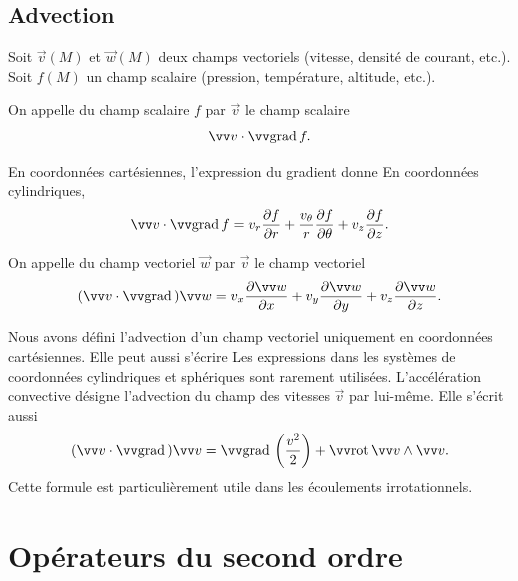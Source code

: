 \subsection{Advection}

Soit $\Vec{v}(M)$ et $\Vec{w}(M)$ deux champs vectoriels (vitesse, densité de courant, etc.). Soit $f(M)$ un champ scalaire (pression, température, altitude, etc.).

\begin{definition}
On appelle  du champ scalaire $f$ par $\Vec{v}$ le champ scalaire $$\Vec{v} \cdot \grad f.$$

\end{definition}

En coordonnées cartésiennes, l'expression du gradient donne
En coordonnées cylindriques,
$$
\Vec{v} \cdot \grad f  =  v_r \dr{f}{r} + \frac{v_\theta}{r} \dr{f}{\theta} + v_z \dr{f}{z}.
$$

\begin{definition}
On appelle  du champ vectoriel $\Vec{w}$ par $\Vec{v}$ le champ vectoriel
$$
(\Vec{v} \cdot \grad) \Vec{w} = v_x \dr{\Vec{w}}{x} + v_y \dr{\Vec{w}}{y} + v_z \dr{\Vec{w}}{z}.
$$

\end{definition}

 Nous avons défini l'advection d'un champ vectoriel uniquement en coordonnées cartésiennes. Elle peut aussi s'écrire
Les expressions dans les systèmes de coordonnées cylindriques et sphériques sont rarement utilisées.
 L’accélération convective désigne l’advection du champ des vitesses $\Vec{v}$ par lui-même. Elle s’écrit aussi
$$
(\Vec{v} \cdot \grad) \Vec{v} = \grad\left( \frac{v^2}{2} \right) + \rot \Vec{v} \pv \Vec{v}.
$$
Cette formule est particulièrement utile dans les écoulements irrotationnels.

\section{Opérateurs du second ordre}


